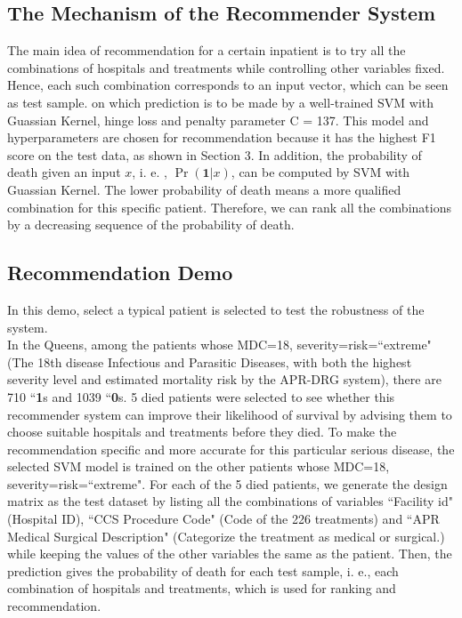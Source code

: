 \documentclass{article}
\begin{document}
\subsection{The Mechanism of the Recommender System}
\indent
The main idea of recommendation for a certain inpatient is to try all the combinations of hospitals and treatments while controlling other variables fixed. Hence, each such combination corresponds to an input vector, which can be seen as test sample. on which prediction is to be made by a well-trained SVM with Guassian Kernel, hinge loss and penalty parameter C = 137. This model and hyperparameters are chosen for recommendation because it has the highest F1 score on the test data, as shown in Section 3. In addition, the probability of death given an input $x$, i. e. , $\Pr(\textbf{1}|x)$, can be computed by SVM with Guassian Kernel. The lower probability of death means a more qualified combination for this specific patient. Therefore, we can rank all the combinations by a decreasing sequence of the probability of death.\\

\subsection{Recommendation Demo}
\indent
In this demo, select a typical patient is selected to test the robustness of the system.\\

In the Queens, among the patients whose MDC=18, severity=risk=``extreme" (The 18th disease Infectious and Parasitic Diseases, with both the highest severity level and estimated mortality risk by the APR-DRG system), there are 710 ``\textbf{1}s and 1039 ``\textbf{0}s. 5 died patients were selected to see whether this recommender system can improve their likelihood of survival by advising them to choose suitable hospitals and treatments before they died. To make the recommendation specific and more accurate for this particular serious disease, the selected SVM model is trained on the other patients whose MDC=18,  severity=risk=``extreme". For each of the 5 died patients, we generate the design matrix as the test dataset by listing all the combinations of variables ``Facility id" (Hospital ID), ``CCS Procedure Code" (Code of the 226 treatments) and ``APR Medical Surgical Description" (Categorize the treatment as medical or surgical.) while keeping the values of the other variables the same as the patient. Then, the prediction gives the probability of death for each test sample, i. e., each combination of hospitals and treatments, which is used for ranking and recommendation.\\
\end{document}
